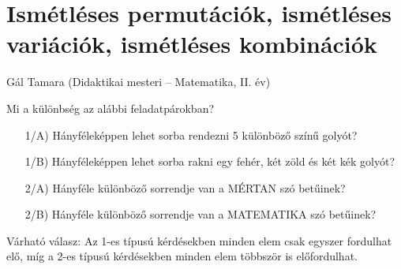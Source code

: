 
\chapter{Ismétléses permutációk, ismétléses variációk, ismétléses kombinációk}\label{chap:ismetleses_perm}
\begin{description}
{\large \item [{Szerző:}] Gál Tamara (Didaktikai mesteri -- Matematika, II. év)}
\end{description}
\begin{problem}
 Mi a különbség az alábbi feladatpárokban?
 \begin{itemize}
 	\item[1/A)] Hányféleképpen lehet sorba rendezni 5 különböző színű golyót?
 	\item[1/B)] Hányféleképpen lehet sorba rakni egy fehér, két zöld és két kék
 	golyót? 
 	\item[2/A)] Hányféle különböző sorrendje van a MÉRTAN szó betűinek?
 	\item[2/B)] Hányféle különböző sorrendje van a MATEMATIKA szó betűinek?
 \end{itemize}
 
\end{problem}
Várható válasz: Az 1-es típusú kérdésekben minden elem csak egyszer
fordulhat elő, míg a 2-es típusú kérdésekben minden elem többször
is előfordulhat.
